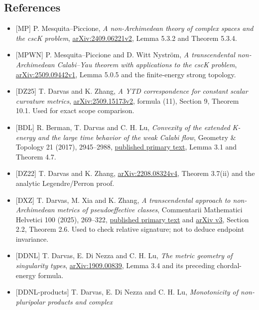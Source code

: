 \documentclass[
  11pt,
]{article}
\providecommand{\tightlist}{%
  \setlength{\itemsep}{0pt}\setlength{\parskip}{0pt}}
\begin{document}
\subsection{References}\label{references}

\begin{itemize}
\tightlist
\item
  {[}MP{]} P. Mesquita--Piccione, \emph{A non-Archimedean theory of
  complex spaces and the cscK problem},
  \href{https://arxiv.org/pdf/2409.06221v2}{arXiv:2409.06221v2}, Lemma
  5.3.2 and Theorem 5.3.4.
\item
  {[}MPWN{]} P. Mesquita--Piccione and D. Witt Nyström, \emph{A
  transcendental non-Archimedean Calabi--Yau theorem with applications
  to the cscK problem},
  \href{https://arxiv.org/pdf/2509.09442v1}{arXiv:2509.09442v1}, Lemma
  5.0.5 and the finite-energy strong topology.
\item
  {[}DZ25{]} T. Darvas and K. Zhang, \emph{A YTD correspondence for
  constant scalar curvature metrics},
  \href{https://arxiv.org/pdf/2509.15173v2}{arXiv:2509.15173v2}, formula
  (11), Section 9, Theorem 10.1. Used for exact scope comparison.
\item
  {[}BDL{]} R. Berman, T. Darvas and C. H. Lu, \emph{Convexity of the
  extended K-energy and the large time behavior of the weak Calabi
  flow}, Geometry \& Topology 21 (2017), 2945--2988,
  \href{https://msp.org/gt/2017/21-5/gt-v21-n5-p08-s.pdf}{published
  primary text}, Lemma 3.1 and Theorem 4.7.
\item
  {[}DZ22{]} T. Darvas and K. Zhang,
  \href{https://arxiv.org/pdf/2208.08324v4}{arXiv:2208.08324v4}, Theorem
  3.7(ii) and the analytic Legendre/Perron proof.
\item
  {[}DXZ{]} T. Darvas, M. Xia and K. Zhang, \emph{A transcendental
  approach to non-Archimedean metrics of pseudoeffective classes},
  Commentarii Mathematici Helvetici 100 (2025), 269--322,
  \href{https://ems.press/content/serial-article-files/50355}{published
  primary text} and \href{https://arxiv.org/pdf/2302.02541v3}{arXiv v3},
  Section 2.2, Theorem 2.6. Used to check relative signature; not to
  deduce endpoint invariance.
\item
  {[}DDNL{]} T. Darvas, E. Di Nezza and C. H. Lu, \emph{The metric
  geometry of singularity types},
  \href{https://arxiv.org/pdf/1909.00839}{arXiv:1909.00839}, Lemma 3.4
  and its preceding chordal-energy formula.
\item
  {[}DDNL-products{]} T. Darvas, E. Di Nezza and C. H. Lu,
  \emph{Monotonicity of non-pluripolar products and complex
}
\end{itemize}
\end{document}
